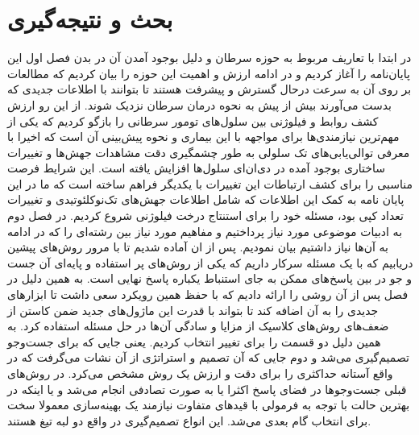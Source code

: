 
\chapter{بحث و نتیجه‌گیری}

در ابتدا با تعاریف مربوط به حوزه سرطان و دلیل بوجود آمدن آن در بدن فصل اول این پایان‌نامه را آغاز کردیم و در ادامه ارزش و اهمیت این حوزه را بیان کردیم که مطالعات بر روی آن به سرعت درحال گسترش و پیشرفت هستند تا بتوانند با اطلاعات جدیدی که بدست می‌آورند بیش از پیش به نحوه درمان سرطان نزدیک شوند. از این رو ارزش کشف روابط و فیلوژنی بین سلول‌های تومور سرطانی را بازگو کردیم که یکی از مهم‌ترین نیازمندی‌ها برای مواجهه با این بیماری و نحوه پیش‌بینی آن است که اخیرا با معرفی توالی‌یابی‌های تک سلولی به طور چشمگیری دقت مشاهدات جهش‌ها و تغییرات ساختاری بوجود آمده در دی‌ان‌ای سلول‌ها افزایش یافته است. این شرایط فرصت مناسبی را برای کشف ارتباطات این تغییرات با یکدیگر فراهم ساخته است که ما در این پایان نامه به کمک این اطلاعات که شامل اطلاعات جهش‌های تک‌نوکلئوتیدی و تغییرات تعداد کپی بود، مسئله خود را برای استنتاج درخت فیلوژنی شروع کردیم. در فصل دوم به ادبیات موضوعی مورد نیاز پرداختیم و مفاهیم مورد نیاز بین رشته‌ای را که در ادامه به آن‌ها نیاز داشتیم بیان نمودیم.
پس از ان آماده شدیم تا با مرور روش‌های پیشین دریابیم که با یک مسئله  سرکار داریم که یکی از روش‌های پر استفاده و پایه‌ای آن جست و جو در بین پاسخ‌های ممکن به جای استنباط یکباره پاسخ نهایی است. به همین دلیل در فصل پس از آن روشی را ارائه دادیم که با حفظ همین رویکرد سعی داشت تا ابزارهای جدیدی را به آن اضافه کند تا بتواند با قدرت این ماژول‌های جدید ضمن کاستن از ضعف‌های روش‌های کلاسیک از مزایا و سادگی آن‌ها در حل مسئله استفاده کرد. به همین دلیل دو قسمت را برای تغییر انتخاب کردیم. 
یعنی جایی که برای جست‌وجو تصمیم‌گیری می‌شد و دوم جایی که آن تصمیم و استراتژی از آن نشات می‌گرفت که در واقع آستانه حداکثری را برای دقت و ارزش یک روش مشخص می‌کرد. در روش‌های قبلی جست‌و‌جوها در فضای پاسخ اکثرا یا به صورت تصادفی انجام می‌شد و یا اینکه در بهترین حالت با توجه به فرمولی با قید‌های متفاوت نیازمند یک بهینه‌سازی معمولا سخت برای انتخاب گام بعدی می‌شد. این انواع تصمیم‌گیری در واقع دو لبه تیغ هستند. 
